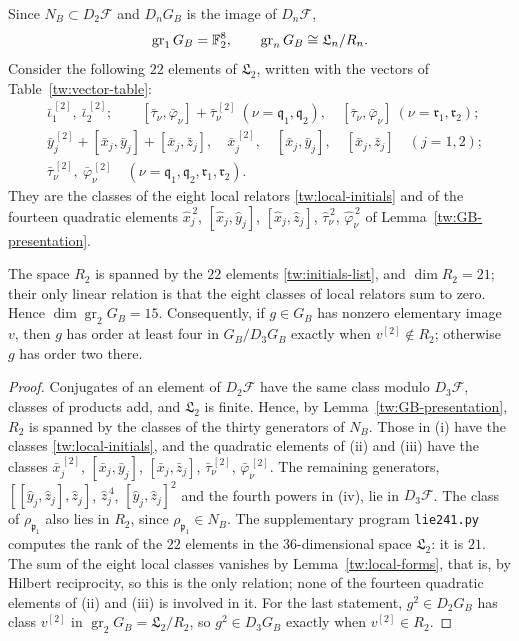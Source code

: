 Since $N_B\subset D_2\mathcal F$ and $D_nG_B$ is
the image of $D_n\mathcal F$,
\[
 \operatorname{gr}_1G_B=\mathbb F_2^8,\qquad
 \operatorname{gr}_nG_B\cong\mathfrak L_n/R_n .
\]
Consider the following $22$ elements of $\mathfrak L_2$, written with the
vectors of Table~\ref{tw:vector-table}:
\begin{equation}\label{tw:initials-list}
\begin{aligned}
 &\bar\iota_1^{\,[2]},\ \bar\iota_2^{\,[2]};\qquad
 [\bar\tau_\nu,\bar\varphi_\nu]+\bar\tau_\nu^{\,[2]}\ (\nu=\mathfrak q_1,\mathfrak q_2),\quad
 [\bar\tau_\nu,\bar\varphi_\nu]\ (\nu=\mathfrak r_1,\mathfrak r_2);\\
 &\bar y_j^{\,[2]}+[\bar x_j,\bar y_j]+[\bar x_j,\bar z_j],\quad
 \bar x_j^{\,[2]},\quad [\bar x_j,\bar y_j],\quad [\bar x_j,\bar z_j]\quad(j=1,2);\\
 &\bar\tau_\nu^{\,[2]},\ \bar\varphi_\nu^{\,[2]}\quad
 (\nu=\mathfrak q_1,\mathfrak q_2,\mathfrak r_1,\mathfrak r_2).
\end{aligned}
\end{equation}
They are the classes of the eight local relators \eqref{tw:local-initials}
and of the fourteen quadratic elements $\hat x_j^{\,2}$,
$[\hat x_j,\hat y_j]$, $[\hat x_j,\hat z_j]$, $\hat\tau_\nu^{\,2}$,
$\hat\varphi_\nu^{\,2}$ of Lemma~\ref{tw:GB-presentation}.

\begin{lemma}\label{tw:quadratic-layer}
The space $R_2$ is spanned by the $22$ elements \eqref{tw:initials-list}, and
$\dim R_2=21$; their only linear relation is that the eight classes of local
relators sum to zero. Hence $\dim\operatorname{gr}_2G_B=15$. Consequently, if
$g\in G_B$ has nonzero elementary image $v$, then $g$ has order at least four
in $G_B/D_3G_B$ exactly when $v^{[2]}\notin R_2$; otherwise $g$ has order two
there.
\end{lemma}

\begin{proof}
Conjugates of an element of $D_2\mathcal F$ have the same class modulo
$D_3\mathcal F$, classes of products add, and $\mathfrak L_2$ is finite.
Hence, by Lemma~\ref{tw:GB-presentation}, $R_2$ is spanned by the classes of
the thirty generators of $N_B$. Those in (i) have the classes
\eqref{tw:local-initials}, and the quadratic elements of (ii) and (iii) have
the classes $\bar x_j^{\,[2]}$, $[\bar x_j,\bar y_j]$, $[\bar x_j,\bar z_j]$,
$\bar\tau_\nu^{\,[2]}$, $\bar\varphi_\nu^{\,[2]}$. The remaining generators,
$[[\hat y_j,\hat z_j],\hat z_j]$, $\hat z_j^{\,4}$, $[\hat y_j,\hat z_j]^2$ and
the fourth powers in (iv), lie in $D_3\mathcal F$. The class of
$\rho_{\mathfrak p_1}$ also lies in $R_2$, since $\rho_{\mathfrak p_1}\in N_B$.
The supplementary program \texttt{lie241.py} computes the rank of the $22$
elements in the $36$-dimensional space $\mathfrak L_2$: it is $21$. The sum of
the eight local classes vanishes by Lemma~\ref{tw:local-forms}, that is, by
Hilbert reciprocity, so this is the only relation; none of the fourteen
quadratic elements of (ii) and (iii) is involved in it. For the last statement, $g^2\in D_2G_B$ has class $v^{[2]}$ in
$\operatorname{gr}_2G_B=\mathfrak L_2/R_2$, so $g^2\in D_3G_B$ exactly when
$v^{[2]}\in R_2$.
\end{proof}

